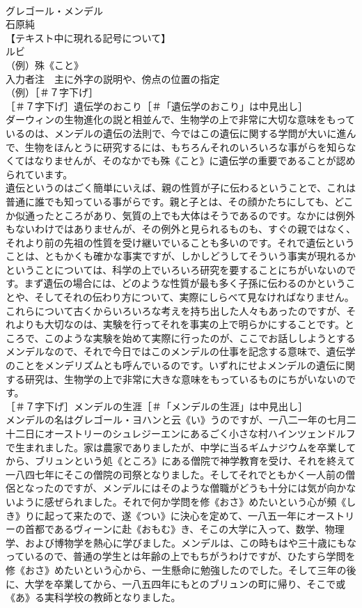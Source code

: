 \documentclass[8pt]{extreport}
\begin{document}
\begin{CJK}{UTF8}{min}
\\	グレゴール・メンデル
\\	石原純
\\	【テキスト中に現れる記号について】
\\	ルビ
\\	（例）殊《こと》
\\	入力者注　主に外字の説明や、傍点の位置の指定
\\	（例）［＃７字下げ］
\\	［＃７字下げ］遺伝学のおこり［＃「遺伝学のおこり」は中見出し］
\\	ダーウィンの生物進化の説と相並んで、生物学の上で非常に大切な意味をもっているのは、メンデルの遺伝の法則で、今ではこの遺伝に関する学問が大いに進んで、生物をほんとうに研究するには、もちろんそれのいろいろな事がらを知らなくてはなりませんが、そのなかでも殊《こと》に遺伝学の重要であることが認められています。
\\	遺伝というのはごく簡単にいえば、親の性質が子に伝わるということで、これは普通に誰でも知っている事がらです。親と子とは、その顔かたちにしても、どこか似通ったところがあり、気質の上でも大体はそうであるのです。なかには例外もないわけではありませんが、その例外と見られるものも、すぐの親ではなく、それより前の先祖の性質を受け継いでいることも多いのです。それで遺伝ということは、ともかくも確かな事実ですが、しかしどうしてそういう事実が現れるかということについては、科学の上でいろいろ研究を要することにちがいないのです。まず遺伝の場合には、どのような性質が最も多く子孫に伝わるのかということや、そしてそれの伝わり方について、実際にしらべて見なければなりません。これらについて古くからいろいろな考えを持ち出した人々もあったのですが、それよりも大切なのは、実験を行ってそれを事実の上で明らかにすることです。ところで、このような実験を始めて実際に行ったのが、ここでお話ししようとするメンデルなので、それで今日ではこのメンデルの仕事を記念する意味で、遺伝学のことをメンデリズムとも呼んでいるのです。いずれにせよメンデルの遺伝に関する研究は、生物学の上で非常に大きな意味をもっているものにちがいないのです。
\\	［＃７字下げ］メンデルの生涯［＃「メンデルの生涯」は中見出し］
\\	メンデルの名はグレゴール・ヨハンと云《い》うのですが、一八二一年の七月二十二日にオーストリーのシュレジーエンにあるごく小さな村ハインツェンドルフで生まれました。家は農家でありましたが、中学に当るギムナジウムを卒業してから、ブリュンという処《ところ》にある僧院で神学教育を受け、それを終えて一八四七年にそこの僧院の司祭となりました。そしてそれでともかく一人前の僧侶となったのですが、メンデルにはそのような僧職がどうも十分には気が向かないように感ぜられました。それで何か学問を修《おさ》めたいという心が頻《しき》りに起って来たので、遂《つい》に決心を定めて、一八五一年にオーストリーの首都であるヴィーンに赴《おもむ》き、そこの大学に入って、数学、物理学、および博物学を熱心に学びました。メンデルは、この時もはや三十歳にもなっているので、普通の学生とは年齢の上でもちがうわけですが、ひたすら学問を修《おさ》めたいという心から、一生懸命に勉強したのでした。そして三年の後に、大学を卒業してから、一八五四年にもとのブリュンの町に帰り、そこで或《あ》る実科学校の教師となりました。

\end{CJK}
\end{document}
